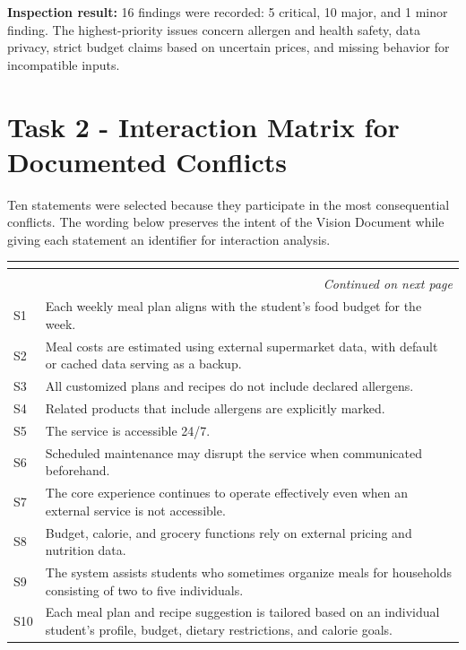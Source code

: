 \documentclass[11pt,a4paper]{article}
\renewcommand{\arraystretch}{1.15}
\begin{document}
\textbf{Inspection result:} 16 findings were recorded: 5 critical, 10 major, and 1 minor finding. The highest-priority issues concern allergen and health safety, data privacy, strict budget claims based on uncertain prices, and missing behavior for incompatible inputs.

\section{Task 2 - Interaction Matrix for Documented Conflicts}

Ten statements were selected because they participate in the most consequential conflicts. The wording below preserves the intent of the Vision Document while giving each statement an identifier for interaction analysis.

\begin{center}
\small
\setlength{\tabcolsep}{2.5pt}
\renewcommand{\arraystretch}{1.18}
\begin{longtable}{|p{1.2cm}|p{14.8cm}|}
\hline
\rowcolor{headerblue} \textbf{\color{white}{ID}} & \textbf{\color{white}{Statement}} \\ \hline
\endfirsthead
\hline
\rowcolor{headerblue} \textbf{\color{white}{ID}} & \textbf{\color{white}{Statement}} \\ \hline
\endhead
\hline
\multicolumn{2}{r}{\small\itshape Continued on next page}\\
\endfoot
\hline
\endlastfoot
S1 & Each weekly meal plan aligns with the student's food budget for the week. \\ \hline
S2 & Meal costs are estimated using external supermarket data, with default or cached data serving as a backup. \\ \hline
S3 & All customized plans and recipes do not include declared allergens. \\ \hline
S4 & Related products that include allergens are explicitly marked. \\ \hline
S5 & The service is accessible 24/7. \\ \hline
S6 & Scheduled maintenance may disrupt the service when communicated beforehand. \\ \hline
S7 & The core experience continues to operate effectively even when an external service is not accessible. \\ \hline
S8 & Budget, calorie, and grocery functions rely on external pricing and nutrition data. \\ \hline
S9 & The system assists students who sometimes organize meals for households consisting of two to five individuals. \\ \hline
S10 & Each meal plan and recipe suggestion is tailored based on an individual student's profile, budget, dietary restrictions, and calorie goals. \\ \hline
\end{longtable}
\end{center}
\end{document}
